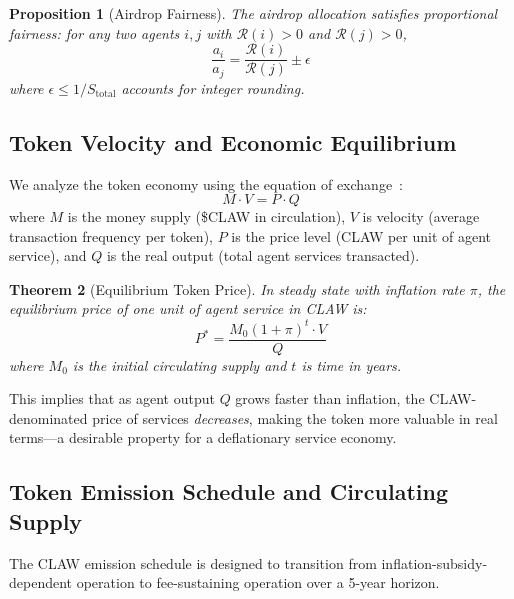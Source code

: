 \documentclass[conference]{IEEEtran}
\newtheorem{theorem}{Theorem}
\newtheorem{proposition}[theorem]{Proposition}
\begin{document}
\begin{proposition}[Airdrop Fairness]
The airdrop allocation satisfies proportional fairness: for any two agents $i, j$ with $\mathcal{R}(i) > 0$ and $\mathcal{R}(j) > 0$,
\begin{equation}
    \frac{a_i}{a_j} = \frac{\mathcal{R}(i)}{\mathcal{R}(j)} \pm \epsilon
\end{equation}
where $\epsilon \leq 1/S_{\text{total}}$ accounts for integer rounding.
\end{proposition}

\subsection{Token Velocity and Economic Equilibrium}

We analyze the token economy using the equation of exchange~\cite{fisher1911equation}:
\begin{equation}
    M \cdot V = P \cdot Q
\end{equation}
where $M$ is the money supply (\$CLAW in circulation), $V$ is velocity (average transaction frequency per token), $P$ is the price level (CLAW per unit of agent service), and $Q$ is the real output (total agent services transacted).

\begin{theorem}[Equilibrium Token Price]\label{thm:price}
In steady state with inflation rate $\pi$, the equilibrium price of one unit of agent service in CLAW is:
\begin{equation}
    P^* = \frac{M_0 (1 + \pi)^t \cdot V}{Q}
\end{equation}
where $M_0$ is the initial circulating supply and $t$ is time in years.
\end{theorem}

This implies that as agent output $Q$ grows faster than inflation, the CLAW-denominated price of services \textit{decreases}, making the token more valuable in real terms---a desirable property for a deflationary service economy.

\subsection{Token Emission Schedule and Circulating Supply}

The CLAW emission schedule is designed to transition from inflation-subsidy-dependent operation to fee-sustaining operation over a 5-year horizon.
\end{document}
